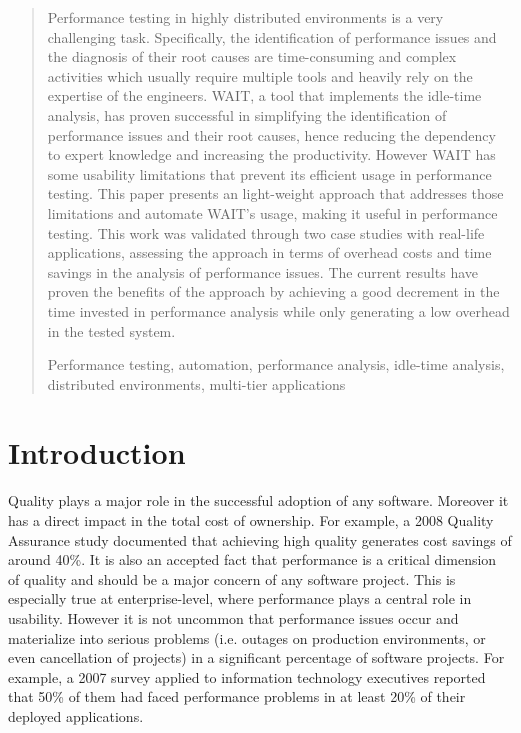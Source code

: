 \documentclass[runningheads,a4paper]{llncs}
\newcommand{\keywords}[1]{\par\addvspace\baselineskip
\noindent\keywordname\enspace\ignorespaces#1}
\begin{document}

\begin{abstract}
Performance testing in highly distributed environments is a very challenging
task. Specifically, the identification of performance issues and
the diagnosis of their root causes are time-consuming and complex
activities which usually require multiple tools and heavily rely on the
expertise of the engineers. WAIT, a tool that implements the idle-time analysis,
has proven successful in simplifying the identification of performance issues
and their root causes, hence reducing the dependency to expert knowledge and 
increasing the productivity. However WAIT has some usability limitations that
prevent its efficient usage in performance testing. This paper presents an 
light-weight approach that addresses those limitations and automate WAIT's
usage, making it useful in performance testing. This work was validated through
two case studies with real-life applications, assessing the approach in terms of
overhead costs and time savings in the analysis of performance issues.
The current results have proven the benefits of the approach by achieving a good
decrement in the time invested in performance analysis while only generating a low 
overhead in the tested system.
\keywords{Performance testing, automation, performance analysis, idle-time
analysis, distributed environments, multi-tier applications}
\end{abstract}


\section{Introduction}

Quality plays a major role in the successful adoption of any software.
Moreover it has a direct impact in the total cost of ownership. For
example, a 2008 Quality Assurance study \cite{CapersJones1} documented that achieving high
quality generates cost savings of around 40\%. It is also an accepted fact that
performance is a critical dimension of quality and should be a major concern of
any software project. This is especially true at enterprise-level, where
performance plays a central role in usability. However it is not uncommon that
performance issues occur and materialize into serious problems (i.e. outages on
production environments, or even cancellation of projects) in a significant
percentage of software projects. For example, a 2007 survey applied to
information technology executives \cite{Compuware1} reported that 50\% of them
had faced performance problems in at least 20\% of their deployed applications.
\end{document}
